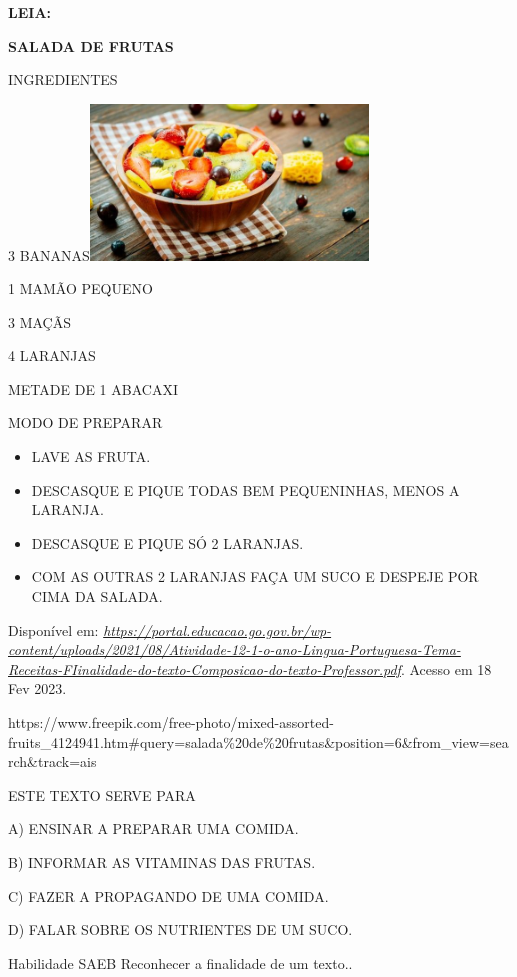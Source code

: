 \textbf{LEIA:}

\textbf{SALADA DE FRUTAS}

INGREDIENTES

3
BANANAS\includegraphics[width=2.90350in,height=1.63264in]{media/image159.jpg}

1 MAMÃO PEQUENO

3 MAÇÃS

4 LARANJAS

METADE DE 1 ABACAXI

MODO DE PREPARAR

\begin{itemize}
\item
  LAVE AS FRUTA.
\item
  DESCASQUE E PIQUE TODAS BEM PEQUENINHAS, MENOS A LARANJA.
\item
  DESCASQUE E PIQUE SÓ 2 LARANJAS.
\item
  COM AS OUTRAS 2 LARANJAS FAÇA UM SUCO E DESPEJE POR CIMA DA SALADA.
\end{itemize}

Disponível em:
\href{https://portal.educacao.go.gov.br/wp-content/uploads/2021/08/Atividade-12-1-o-ano-Lingua-Portuguesa-Tema-Receitas-FIinalidade-do-texto-Composicao-do-texto-Professor.pdf}{\emph{https://portal.educacao.go.gov.br/wp-content/uploads/2021/08/Atividade-12-1-o-ano-Lingua-Portuguesa-Tema-Receitas-FIinalidade-do-texto-Composicao-do-texto-Professor.pdf}}.
Acesso em 18 Fev 2023.

https://www.freepik.com/free-photo/mixed-assorted-fruits\_4124941.htm\#query=salada\%20de\%20frutas\&position=6\&from\_view=search\&track=ais

ESTE TEXTO SERVE PARA

A) ENSINAR A PREPARAR UMA COMIDA.

B) INFORMAR AS VITAMINAS DAS FRUTAS.

C) FAZER A PROPAGANDO DE UMA COMIDA.

D) FALAR SOBRE OS NUTRIENTES DE UM SUCO.

Habilidade SAEB Reconhecer a finalidade de um texto..

